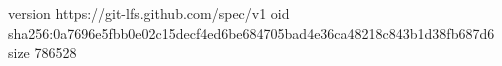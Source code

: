 version https://git-lfs.github.com/spec/v1
oid sha256:0a7696e5fbb0e02c15decf4ed6be684705bad4e36ca48218c843b1d38fb687d6
size 786528
